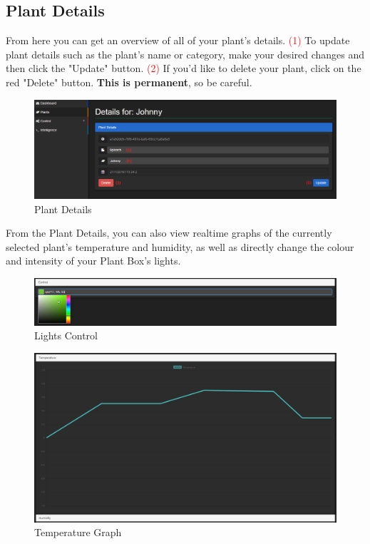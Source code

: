 \documentclass{article}
\begin{document}
	\subsection{Plant Details}
	\label{sec:plant-details}
	From here you can get an overview of all of your plant's details.
	\newline
	\textcolor{red}{(1)} To update plant details such as the plant's name or category, make your desired changes and then click the "Update" button.
	\newline
	\textcolor{red}{(2)} If you'd like to delete your plant, click on the red "Delete" button. \textbf{This is permanent}, so be careful.
	\begin{figure}[H]
		\includegraphics[width=\textwidth]{../images/UserManual/plant-details.PNG}
		\caption{Plant Details}
	\end{figure}
	
	From the Plant Details, you can also view realtime graphs of the currently selected plant's temperature and humidity, as well as directly change the colour and intensity of your Plant Box's lights.
	
	\begin{figure}[H]
		\includegraphics[width=\textwidth]{../images/UserManual/lights.png}
		\caption{Lights Control}
	\end{figure}	
	
	\begin{figure}[H]
		\includegraphics[width=\textwidth]{../images/UserManual/temperature.png}
		\caption{Temperature Graph}
	\end{figure}
\end{document}
